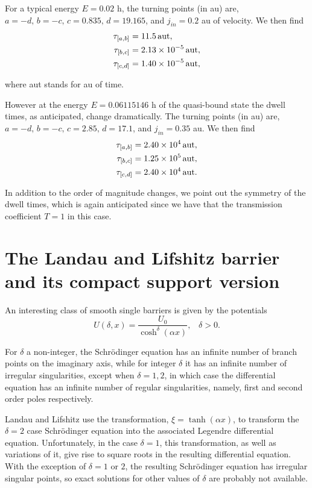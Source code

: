 \documentclass{article}
\numberwithin{equation}{section}
\begin{document}
For a typical energy $E=0.02$ h, the turning points (in au) are, $a=-d,\,b=-c,\,c=0.835,\,d=19.165$, and $j_{in}=0.2$ au of velocity.  We then find
\begin{align}
\tau_{\left[a,b\right]}&=11.5\,\textup{aut},\label{tau1a}\\
\tau_{\left[b,c\right]}&=2.13\times 10^{-5}\,\textup{aut},\label{tau1b}\\
\tau_{\left[c,d\right]}&=1.40\times 10^{-5}\,\textup{aut},\label{tau1c}
\end{align}

where aut stands for au of time.

However at the energy $E=0.06115146$ h of the quasi-bound state the dwell times, as anticipated, change dramatically.  The turning points (in au) are, $a=-d,\,b=-c,\,c=2.85,\,d=17.1$, and $j_{in}=0.35$ au.  We then find
\begin{align}
\tau_{\left[a,b\right]}&=2.40\times 10^4\,\textup{aut},\label{tau2a}\\
\tau_{\left[b,c\right]}&=1.25\times 10^5\,\textup{aut},\label{tau2b}\\
\tau_{\left[c,d\right]}&=2.40\times 10^4\,\textup{aut}.\label{tau2c}
\end{align}

In addition to the order of magnitude changes, we point out the symmetry of the dwell times, which is again anticipated since we have that the transmission coefficient $T=1$ in this case.

\section{The Landau and Lifshitz barrier and its compact support version}\label{LL}

An interesting class of smooth single barriers is given by the potentials
\begin{equation}
U(\delta,x)=\frac{U_0}{\cosh^\delta(\alpha x)},\;\;\;\delta>0.\label{Udel}
\end{equation}

For $\delta$ a non-integer, the Schr\"odinger equation has an infinite number of branch points on the imaginary axis, while for integer $\delta$ it has an infinite number of irregular singularities, except when $\delta=1,2$, in which case the differential equation has an infinite number of regular singularities, namely, first and second order poles respectively.  

Landau and Lifshitz use the transformation, $\xi=\tanh{(\alpha x)}$, to transform the $\delta=2$ case Schr\"{o}dinger equation into the associated Legendre differential equation.  Unfortunately, in the case $\delta=1$, this transformation, as well as variations of it, give rise to square roots in the resulting differential equation. With the exception of $\delta=1$ or $2$, the resulting Schr\"{o}dinger equation has irregular singular points, so exact solutions for other values of $\delta$ are probably not available.  
\end{document}
